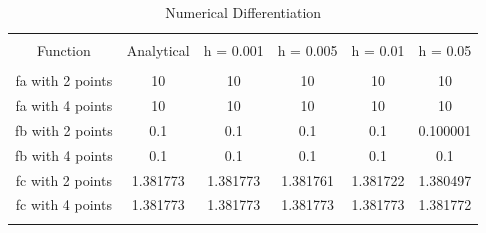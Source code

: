 
\begin{table}[!htbp] \centering 
  \caption{Numerical Differentiation} 
  \label{tab:differentiation} 
\begin{tabular}{@{\extracolsep{5pt}} cccccc} 
\\[-1.8ex]\hline 
\hline \\[-1.8ex] 
Function & Analytical & h = 0.001 & h = 0.005 & h = 0.01 & h = 0.05 \\ 
\hline \\[-1.8ex] 
fa with 2 points & 10 & 10 & 10 & 10 & 10 \\ 
fa with 4 points & 10 & 10 & 10 & 10 & 10 \\ 
fb with 2 points & 0.1 & 0.1 & 0.1 & 0.1 & 0.100001 \\ 
fb with 4 points & 0.1 & 0.1 & 0.1 & 0.1 & 0.1 \\ 
fc with 2 points & 1.381773 & 1.381773 & 1.381761 & 1.381722 & 1.380497 \\ 
fc with 4 points & 1.381773 & 1.381773 & 1.381773 & 1.381773 & 1.381772 \\ 
\hline \\[-1.8ex] 
\end{tabular} 
\end{table} 
